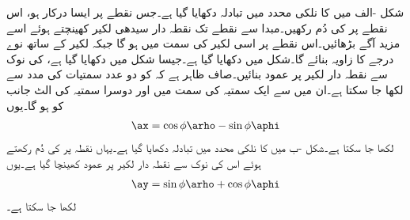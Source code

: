 شکل -الف میں  کا نلکی محدد میں تبادلہ دکھایا گیا ہے۔جس نقطے پر ایسا درکار ہو، اس نقطے پر  کی دُم رکھیں۔مبدا سے نقطے تک نقطہ دار سیدھی لکیر کھینچتے ہوئے اسے مزید آگے بڑھائیں۔اس نقطے پر  اسی لکیر کی سمت میں ہو گا جبکہ  لکیر کے ساتھ نوے درجے کا زاویہ بنائے گا۔شکل میں  دکھایا گیا ہے۔جیسا شکل میں دکھایا گیا ہے،  کی نوک سے نقطہ دار لکیر پر عمود بنائیں۔صاف ظاہر ہے کہ  کو دو عدد سمتیات کی مدد سے لکھا جا سکتا ہے۔ان میں سے ایک سمتیہ  کی سمت میں اور دوسرا سمتیہ  کی الٹ جانب کو ہو گا۔یوں
\begin{align}\label{مساوات_سمتیہ_اکائی_ایکس_نلکی_میں}
\ax=\cos \phi \arho-\sin \phi \aphi
\end{align}
لکھا جا سکتا ہے۔شکل -ب میں  کا نلکی محدد میں تبادلہ دکھایا گیا ہے۔یہاں نقطہ پر  کی دُم رکھتے ہوئے اس کی نوک سے نقطہ دار لکیر پر عمود کھینچا گیا ہے۔یوں
\begin{align}\label{مساوات_سمتیہ_اکائی_وائے_نلکی_میں}
\ay=\sin \phi \arho+\cos \phi \aphi
\end{align}
لکھا جا سکتا ہے۔

